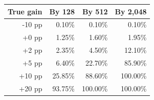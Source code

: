 \begin{tabular}{rrrr}
\toprule
True gain & By 128 & By 512 & By 2,048 \\
\midrule
-10 pp & 0.10\% & 0.10\% & 0.10\% \\
+0 pp & 1.25\% & 1.60\% & 1.95\% \\
+2 pp & 2.35\% & 4.50\% & 12.10\% \\
+5 pp & 6.40\% & 22.70\% & 85.90\% \\
+10 pp & 25.85\% & 88.60\% & 100.00\% \\
+20 pp & 93.75\% & 100.00\% & 100.00\% \\
\bottomrule
\end{tabular}
